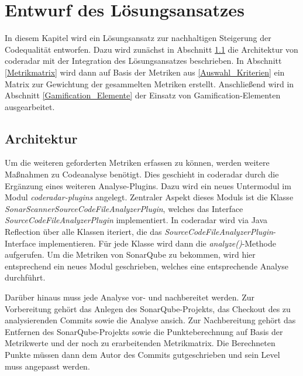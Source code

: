 \documentclass[
	oneside,  %
	ngerman, 
	final, 
	11pt, 
	a4paper, 
	1.1headlines, 
	headinclude=false, 
	footinclude=false, 
	mpinclude=false, 
	pagesize, 
	onecolumn, 
	titlepage, 
	parskip=half, 
	headsepline, 
	chapterprefix=false, 
	version=first, 
	listof=totoc, 
	bibliography=totoc, 
	toc=graduated, 
	fleqn
]{scrbook}
\begin{document}
\chapter{Entwurf des Lösungsansatzes}
\label{Entwurf}
In diesem Kapitel wird ein Lösungsansatz zur nachhaltigen Steigerung der Codequalität entworfen.
Dazu wird zunächst in Abschnitt \ref{Architektur} die Architektur von coderadar mit der Integration des Lösungsansatzes beschrieben.
In Abschnitt \ref{Metrikmatrix} wird dann auf Basis der Metriken aus \ref{Auswahl_Kriterien} ein Matrix zur Gewichtung der gesammelten Metriken erstellt.
Anschließend wird in Abschnitt \ref{Gamification_Elemente} der Einsatz von Gamification-Elementen ausgearbeitet.

\section{Architektur}
\label{Architektur}

Um die weiteren geforderten Metriken erfassen zu können, werden weitere Maßnahmen zu Codeanalyse benötigt.
Dies geschieht in coderadar durch die Ergänzung eines weiteren Analyse-Plugins.
Dazu wird ein neues Untermodul im Modul \textit{coderadar-plugins} angelegt.
Zentraler Aspekt dieses Moduls ist die Klasse \textit{SonarScannerSourceCodeFileAnalyzerPlugin}, welches das Interface \textit{SourceCodeFileAnalyzerPlugin} implementiert.
In coderadar wird via Java Reflection über alle Klassen iteriert, die das \textit{SourceCodeFileAnalyzerPlugin}-Interface implementieren.
Für jede Klasse wird dann die \textit{analyze()}-Methode aufgerufen.
Um die Metriken von SonarQube zu bekommen, wird hier entsprechend ein neues Modul geschrieben, welches eine entsprechende Analyse durchführt.

Darüber hinaus muss jede Analyse vor- und nachbereitet werden.
Zur Vorbereitung gehört das Anlegen des SonarQube-Projekts, das Checkout des zu analysierenden Commits sowie die Analyse ansich.
Zur Nachbereitung gehört das Entfernen des SonarQube-Projekts sowie die Punkteberechnung auf Basis der Metrikwerte und der noch zu erarbeitenden Metrikmatrix.
Die Berechneten Punkte müssen dann dem Autor des Commits gutgeschrieben und sein Level muss angepasst werden.
\end{document}
